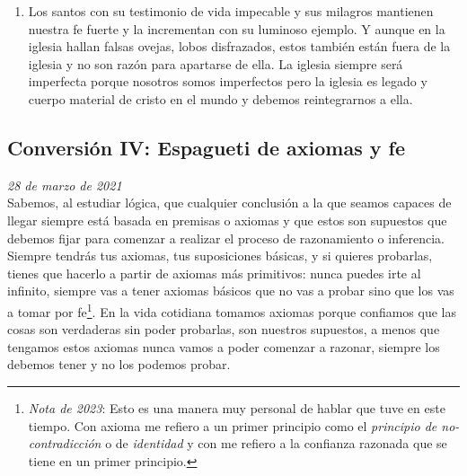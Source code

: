 \documentclass[12pt]{article}
\begin{document}
\begin{enumerate}
	\item Los santos con su testimonio de vida impecable y sus milagros
	mantienen nuestra fe fuerte y la incrementan con su luminoso ejemplo.
	Y aunque en la iglesia hallan falsas ovejas, lobos disfrazados, estos
	también están fuera de la iglesia y no son razón para apartarse de ella.
	La iglesia siempre será imperfecta porque nosotros somos imperfectos
	pero la iglesia es legado y cuerpo material de cristo en el mundo y
	debemos reintegrarnos a ella. 
	\end{enumerate}

	\newpage

	\subsection{Conversión IV: Espagueti de axiomas y fe}

	\textit{28 de marzo de 2021}\\

	Sabemos, al estudiar lógica, que cualquier conclusión a la que seamos
	capaces de llegar siempre está basada en premisas o axiomas y que
	estos son supuestos que debemos fijar para comenzar a realizar el
	proceso de razonamiento o inferencia. Siempre tendrás tus axiomas, tus
	suposiciones básicas, y si quieres probarlas, tienes que hacerlo a
	partir de axiomas más primitivos: nunca puedes irte al infinito, siempre
	vas a tener axiomas básicos que no vas a probar sino que los vas a tomar
	por fe\footnote{\textit{Nota de 2023}: Esto es una manera muy personal
	de hablar que tuve en este tiempo. Con axioma me refiero a un primer
	principio como el \textit{principio de no-contradicción} o de
	\textit{identidad} y con
	 me refiero a
	la confianza razonada que se tiene en un primer principio.}. En la vida
	cotidiana
	tomamos axiomas porque confiamos que las
	cosas son verdaderas sin poder probarlas, son nuestros supuestos, a
	menos que tengamos estos axiomas nunca vamos a poder comenzar a razonar,
	siempre los debemos tener y no los podemos probar.
\end{document}
